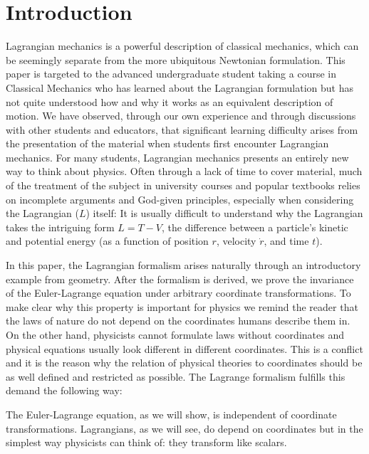 \documentclass[prb,preprint]{revtex4-1}
\begin{document}
\maketitle



\section{Introduction}\label{introduction}

Lagrangian mechanics is a powerful description of classical mechanics, which can be seemingly separate from the more ubiquitous Newtonian formulation. This paper is targeted to the advanced undergraduate student taking a course in Classical Mechanics who has learned about the Lagrangian formulation but has not quite understood how and why it works as an equivalent description of motion. We have observed, through our own experience and through discussions with other students and educators, that significant learning difficulty arises from the presentation of the material when students first encounter Lagrangian mechanics. For many students, Lagrangian mechanics presents an entirely new way to think about physics. Often through a lack of time to cover material, much of the treatment of the subject in university courses and popular textbooks relies on incomplete arguments and God-given principles, especially when considering the Lagrangian ($L$) itself: It is usually difficult to understand why the Lagrangian takes the intriguing form $L=T-V$, the difference between a particle's kinetic and potential energy (as a function of position $r$, velocity $\dot{r}$, and time $t$). 

In this paper, the Lagrangian formalism arises naturally through an introductory example from geometry. After the formalism is derived, we prove the invariance of the Euler-Lagrange equation under arbitrary coordinate transformations. To make clear why this property is important for physics we remind the reader that the laws of nature do not depend on the coordinates humans describe them in. On the other hand, physicists cannot formulate laws without coordinates and physical equations usually look different in different coordinates. This is a conflict and it is the reason why the relation of physical theories to coordinates should be as well defined and restricted as possible. The Lagrange formalism fulfills this demand the following way: 

The Euler-Lagrange equation, as we will show, is independent of coordinate transformations. Lagrangians, as we will see, do depend on coordinates but in the simplest way physicists can think of: they transform like scalars. 
\end{document}
